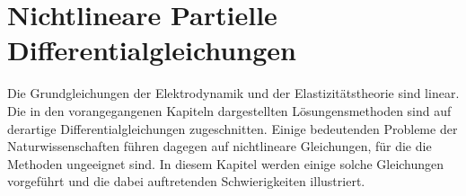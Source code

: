 %
%
%
\chapter{Nichtlineare Partielle Differentialgleichungen\label{chapter-nichtlinear}}
\rhead{}
Die Grundgleichungen der Elektrodynamik und der Elastizitätstheorie
sind linear. Die in den vorangegangenen Kapiteln dargestellten
Lösungensmethoden sind auf derartige Differentialgleichungen
zugeschnitten. Einige bedeutenden Probleme der Naturwissenschaften
führen dagegen auf nichtlineare Gleichungen, für die die
Methoden ungeeignet sind. In diesem Kapitel werden einige
solche Gleichungen vorgeführt und die dabei auftretenden
Schwierigkeiten illustriert.








